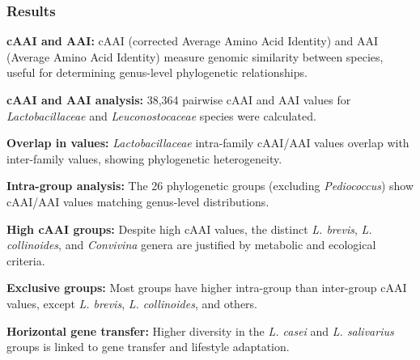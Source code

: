 \subsubsection{Results}
\textbf{cAAI and AAI:} cAAI (corrected Average Amino Acid Identity) and AAI (Average Amino Acid Identity) measure genomic similarity between species, useful for determining genus-level phylogenetic relationships.

\textbf{cAAI and AAI analysis:} 38,364 pairwise cAAI and AAI values for \textit{Lactobacillaceae} and \textit{Leuconostocaceae} species were calculated.

\textbf{Overlap in values:} \textit{Lactobacillaceae} intra-family cAAI/AAI values overlap with inter-family values, showing phylogenetic heterogeneity.

\textbf{Intra-group analysis:} The 26 phylogenetic groups (excluding \textit{Pediococcus}) show cAAI/AAI values matching genus-level distributions.

\textbf{High cAAI groups:} Despite high cAAI values, the distinct \textit{L. brevis}, \textit{L. collinoides}, and \textit{Convivina} genera are justified by metabolic and ecological criteria.

\textbf{Exclusive groups:} Most groups have higher intra-group than inter-group cAAI values, except \textit{L. brevis}, \textit{L. collinoides}, and others.

\textbf{Horizontal gene transfer:} Higher diversity in the \textit{L. casei} and \textit{L. salivarius} groups is linked to gene transfer and lifestyle adaptation.